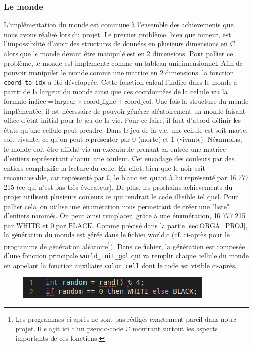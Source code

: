 \documentclass[a4paper]{article}
\begin{document}
\subsubsection{Le monde}
\indent L'implémentation du monde est commune à l'ensemble des achievements que nous avons réalisé lors du projet. Le premier problème, bien que mineur, est l'impossibilité d'avoir des structures de données en plusieurs dimensions en C alors que le monde devant être manipulé est en 2 dimensions. Pour pallier ce problème, le monde est implémenté comme un tableau unidimensionnel. Afin de pouvoir manipuler le monde comme une matrice en 2 dimensions, la fonction \texttt{coord\_to\_idx} a été développée. Cette fonction calcul l'indice dans le monde à partir de la largeur du monde ainsi que des coordonnées de la cellule via la formule \texttt{\(\text{indice} = \text{largeur}\times \text{coord\_ligne} + \text{coord\_col}\)}. Une fois la structure du monde implémentée, il est nécessaire de pouvoir générer aléatoirement un monde faisant office d'état initial pour le jeu de la vie. Pour ce faire, il faut d'abord définir les états qu'une cellule peut prendre. Dans le jeu de la vie, une cellule est soit morte, soit vivante, ce qu'on peut représenter par 0 (morte) et 1 (vivante). Néanmoins, le monde doit être affiché via un exécutable prenant en entrée une matrice d'entiers représentant chacun une couleur. Cet encodage des couleurs par des entiers complexifie la lecture du code. En effet, bien que le noir soit reconnaissable, car représenté par 0, le blanc est quant à lui représenté par 16 777 215 (ce qui n'est pas très évocateur). De plus, les prochains achievements du projet utilisent plusieurs couleurs ce qui rendrait le code illisible tel quel. Pour pallier cela, on utilise une énumération nous permettant de créer une "liste" d'entiers nommés. On peut ainsi remplacer, grâce à une énumération, 16 777 215 par {\small WHITE} et 0 par {\small BLACK}.
Comme précisé dans la partie \ref{sec:ORGA_PROJ}, la génération du monde est gérée dans le fichier world.c (cf. ci-après pour le programme de génération aléatoire\footnote{Les programmes ci-après ne sont pas rédigés exactement pareil dans notre projet. Il s'agit ici d'un pseudo-code C montrant surtout les aspects importants de ces fonctions.}).
Dans ce fichier, la génération est composée d'une fonction principale \texttt{world\_init\_gol} qui va remplir chaque cellule du monde en appelant la fonction auxiliaire \texttt{color\_cell} dont le code est visible ci-après.
\begin{figure}[htb]
    \centering
    \includegraphics[scale=0.8]{img/WB.png}
\end{figure}
\end{document}

